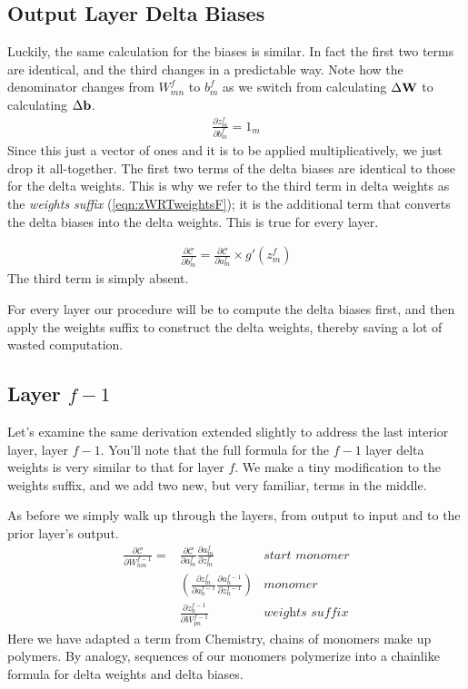 \documentclass[twocolumn]{revtex4-1}
\newcommand{\bld}[1]{\vectorbold{#1}}
\newcommand{\cC}{\mathscr{C}}
\newcommand{\parpar}[2]{\frac{\partial #1}{\partial #2}}
\begin{document}
\subsection{Output Layer Delta Biases}
Luckily, the same calculation for the biases is similar. In fact the first two terms are identical, and the third changes in a predictable way. Note how the denominator changes from $W^f_{m n}$ to $b^f_m$ as we switch from calculating $\Delta \bld{W}$ to calculating $\Delta \bld{b}$.
\begin{align}
    \label{eqn:zWRTbiasesF}
    \parpar{z^f_m}{b^f_m} = 1_m
\end{align}
Since this just a vector of ones and it is to be applied multiplicatively, we just drop it all-together. The first two terms of the delta biases are identical to those for the delta weights. This is why we refer to the third term in delta weights as the \textit{weights suffix}  (\ref{eqn:zWRTweightsF}); it is the additional term that converts the delta biases into the delta weights. This is true for every layer.

\begin{align}
    \parpar{\cC}{b^f_m} = \parpar{\cC}{a^f_m} \times g'(z^f_m)
\end{align}
The third term is simply absent.

For every layer our procedure will be to compute the delta biases first, and then apply the weights suffix to construct the delta weights, thereby saving a lot of wasted computation.

\subsection{Layer $f-1$}
Let's examine the same derivation extended slightly to address the last interior layer, layer $f-1$. You'll note that the full formula for the $f-1$ layer delta weights is very similar to that for layer $f$. We make a tiny modification to the weights suffix, and we add two new, but very familiar, terms in the middle.

As before we simply walk up through the layers, from output to input and to the prior layer's output.
\begin{align}
    \parpar{\cC}{W^{f-1}_{n m}} = & \parpar{\cC}{a^f_m} \parpar{a^f_m}{z^f_m} & \textit{start monomer}\nonumber \\
    & \left(\parpar{z^f_m}{a^{f-1}_n} \parpar{a^{f-1}_n}{z^{f-1}_n} \right) & \textit{monomer}\nonumber \\
    & \parpar{z^{f-1}_n}{W^{f-1}_{p n}} & \textit{weights suffix}
\end{align}
Here we have adapted a term from Chemistry, chains of monomers make up polymers. By analogy, sequences of our monomers polymerize into a chainlike formula for delta weights and delta biases.
\end{document}
